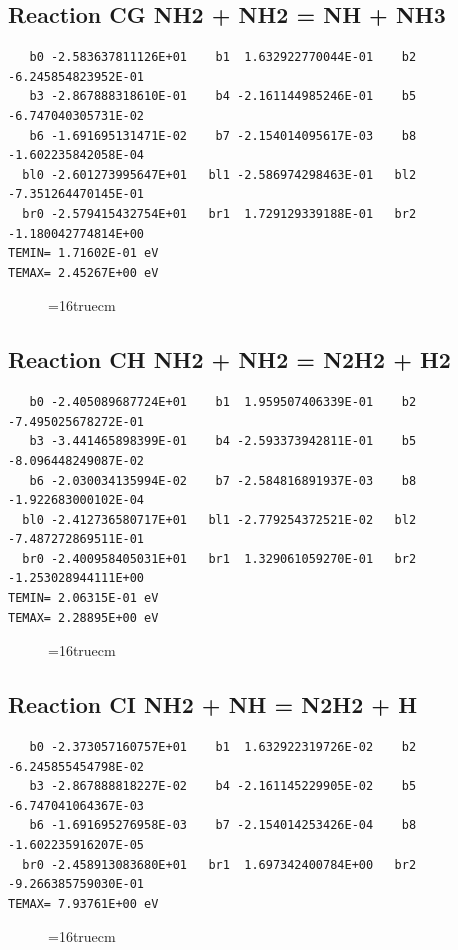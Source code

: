 \documentclass[12pt,dvipdfm]{article}
\begin{document}
\subsection{
Reaction CG NH2 + NH2  = NH + NH3 }
\begin{small}\begin{verbatim}
   b0 -2.583637811126E+01    b1  1.632922770044E-01    b2 -6.245854823952E-01
   b3 -2.867888318610E-01    b4 -2.161144985246E-01    b5 -6.747040305731E-02
   b6 -1.691695131471E-02    b7 -2.154014095617E-03    b8 -1.602235842058E-04
  bl0 -2.601273995647E+01   bl1 -2.586974298463E-01   bl2 -7.351264470145E-01
  br0 -2.579415432754E+01   br1  1.729129339188E-01   br2 -1.180042774814E+00
TEMIN= 1.71602E-01 eV
TEMAX= 2.45267E+00 eV
   \end{verbatim}\end{small}
\begin{figure}[h!]
\label{n2rates}
\epsfxsize=16truecm
\end{figure}
\newpage

\subsection{
Reaction CH NH2 + NH2  = N2H2 + H2 }
\begin{small}\begin{verbatim}
   b0 -2.405089687724E+01    b1  1.959507406339E-01    b2 -7.495025678272E-01
   b3 -3.441465898399E-01    b4 -2.593373942811E-01    b5 -8.096448249087E-02
   b6 -2.030034135994E-02    b7 -2.584816891937E-03    b8 -1.922683000102E-04
  bl0 -2.412736580717E+01   bl1 -2.779254372521E-02   bl2 -7.487272869511E-01
  br0 -2.400958405031E+01   br1  1.329061059270E-01   br2 -1.253028944111E+00
TEMIN= 2.06315E-01 eV
TEMAX= 2.28895E+00 eV
   \end{verbatim}\end{small}
\begin{figure}[h!]
\label{n2rates}
\epsfxsize=16truecm
\end{figure}
\newpage

\subsection{
Reaction CI NH2 + NH = N2H2 + H }
\begin{small}\begin{verbatim}
   b0 -2.373057160757E+01    b1  1.632922319726E-02    b2 -6.245855454798E-02
   b3 -2.867888818227E-02    b4 -2.161145229905E-02    b5 -6.747041064367E-03
   b6 -1.691695276958E-03    b7 -2.154014253426E-04    b8 -1.602235916207E-05
  br0 -2.458913083680E+01   br1  1.697342400784E+00   br2 -9.266385759030E-01
TEMAX= 7.93761E+00 eV
   \end{verbatim}\end{small}
\begin{figure}[h!]
\label{n2rates}
\epsfxsize=16truecm
\end{figure}
\newpage
\end{document}
